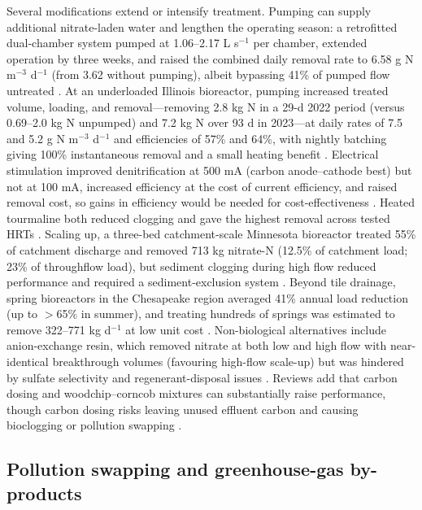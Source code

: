 \documentclass[11pt]{article}
\begin{document}
Several modifications extend or intensify treatment. Pumping can supply additional nitrate-laden water and lengthen the operating season: a retrofitted dual-chamber system pumped at 1.06--2.17 L s$^{-1}$ per chamber, extended operation by three weeks, and raised the combined daily removal rate to 6.58 g N m$^{-3}$ d$^{-1}$ (from 3.62 without pumping), albeit bypassing 41\% of pumped flow untreated \parencite{Hartfiel2023}. At an underloaded Illinois bioreactor, pumping increased treated volume, loading, and removal---removing 2.8 kg N in a 29-d 2022 period (versus 0.69--2.0 kg N unpumped) and 7.2 kg N over 93 d in 2023---at daily rates of 7.5 and 5.2 g N m$^{-3}$ d$^{-1}$ and efficiencies of 57\% and 64\%, with nightly batching giving 100\% instantaneous removal and a small heating benefit \parencite{DíazGarcía2025}. Electrical stimulation improved denitrification at 500 mA (carbon anode--cathode best) but not at 100 mA, increased efficiency at the cost of current efficiency, and raised removal cost, so gains in efficiency would be needed for cost-effectiveness \parencite{Law2018}. Heated tourmaline both reduced clogging and gave the highest removal across tested HRTs \parencite{Ma2021}. Scaling up, a three-bed catchment-scale Minnesota bioreactor treated 55\% of catchment discharge and removed 713 kg nitrate-N (12.5\% of catchment load; 23\% of throughflow load), but sediment clogging during high flow reduced performance and required a sediment-exclusion system \parencite{Feyereisen2023}. Beyond tile drainage, spring bioreactors in the Chesapeake region averaged 41\% annual load reduction (up to $>$65\% in summer), and treating hundreds of springs was estimated to remove 322--771 kg d$^{-1}$ at low unit cost \parencite{Easton2019}. Non-biological alternatives include anion-exchange resin, which removed nitrate at both low and high flow with near-identical breakthrough volumes (favouring high-flow scale-up) but was hindered by sulfate selectivity and regenerant-disposal issues \parencite{MAGETTE1990}. Reviews add that carbon dosing and woodchip--corncob mixtures can substantially raise performance, though carbon dosing risks leaving unused effluent carbon and causing bioclogging or pollution swapping \parencite{Wang2025b}.

\subsection{Pollution swapping and greenhouse-gas by-products}
\end{document}
